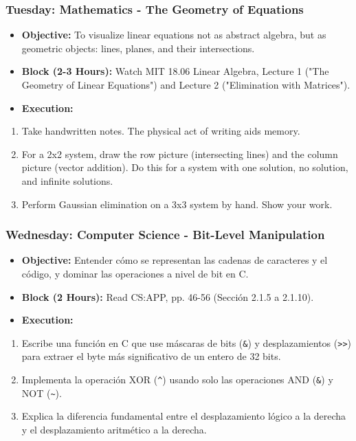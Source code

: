 \documentclass[11pt,a4paper]{report}
\begin{document}
\subsubsection{\textbf{Tuesday: Mathematics - The Geometry of Equations}}
\begin{itemize}
  \item \textbf{Objective:} To visualize linear equations not as abstract algebra, but as geometric objects: lines, planes, and their intersections.
  \item \textbf{Block (2-3 Hours):} Watch MIT 18.06 Linear Algebra, Lecture 1 ("The Geometry of Linear Equations") and Lecture 2 ("Elimination with Matrices").
  \item \textbf{Execution:}
\end{itemize}
\begin{enumerate}
  \item Take handwritten notes. The physical act of writing aids memory.
  \item For a 2x2 system, draw the row picture (intersecting lines) and the column picture (vector addition). Do this for a system with one solution, no solution, and infinite solutions.
  \item Perform Gaussian elimination on a 3x3 system by hand. Show your work.

\end{enumerate}
\subsubsection{\textbf{Wednesday: Computer Science - Bit-Level Manipulation}}
\begin{itemize}
  \item \textbf{Objective:} Entender cómo se representan las cadenas de caracteres y el código, y dominar las operaciones a nivel de bit en C.
  \item \textbf{Block (2 Hours):} Read CS:APP, pp. 46-56 (Sección 2.1.5 a 2.1.10).
  \item \textbf{Execution:}
\end{itemize}
\begin{enumerate}
  \item Escribe una función en C que use máscaras de bits (\texttt{\&}) y desplazamientos (\texttt{\textgreater{}\textgreater{}}) para extraer el byte más significativo de un entero de 32 bits.
  \item Implementa la operación XOR (\texttt{\textasciicircum{}}) usando solo las operaciones AND (\texttt{\&}) y NOT (\texttt{\textasciitilde{}}).
  \item Explica la diferencia fundamental entre el desplazamiento lógico a la derecha y el desplazamiento aritmético a la derecha.

\end{enumerate}
\end{document}
